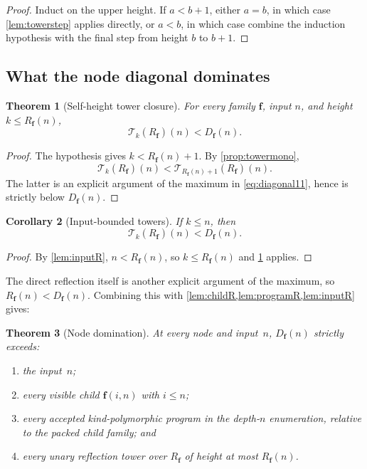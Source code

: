 \documentclass[11pt]{article}
\newtheorem{theorem}{Theorem}[section]
\newtheorem{corollary}[theorem]{Corollary}
\theoremstyle{definition}
\theoremstyle{remark}
\newcommand{\Rfam}{\ensuremath{R_{\mathbf f}}}
\newcommand{\Dfam}{\ensuremath{D_{\mathbf f}}}
\begin{document}
\begin{proof}
Induct on the upper height. If $a<b+1$, either $a=b$, in which case
\cref{lem:towerstep} applies directly, or $a<b$, in which case combine the
induction hypothesis with the final step from height $b$ to $b+1$.
\end{proof}

\subsection{What the node diagonal dominates}

\begin{theorem}[Self-height tower closure]
\label{thm:towerclosure}
For every family $\mathbf f$, input $n$, and height $k\le\Rfam(n)$,
\[
  \mathcal T_k(\Rfam)(n)<\Dfam(n).
\]
\end{theorem}

\begin{proof}
The hypothesis gives $k<\Rfam(n)+1$. By
\cref{prop:towermono},
\[
  \mathcal T_k(\Rfam)(n)
  <\mathcal T_{\Rfam(n)+1}(\Rfam)(n).
\]
The latter is an explicit argument of the maximum in
\cref{eq:diagonal11}, hence is strictly below $\Dfam(n)$.
\end{proof}

\begin{corollary}[Input-bounded towers]
If $k\le n$, then
\[
  \mathcal T_k(\Rfam)(n)<\Dfam(n).
\]
\end{corollary}

\begin{proof}
By \cref{lem:inputR}, $n<\Rfam(n)$, so $k\le\Rfam(n)$ and
\cref{thm:towerclosure} applies.
\end{proof}

The direct reflection itself is another explicit argument of the maximum, so
$\Rfam(n)<\Dfam(n)$. Combining this with
\cref{lem:childR,lem:programR,lem:inputR} gives:

\begin{theorem}[Node domination]
\label{thm:nodedom}
At every node and input~$n$, $\Dfam(n)$ strictly exceeds:
\begin{enumerate}[leftmargin=*]
\item the input~$n$;
\item every visible child $\mathbf f(i,n)$ with $i\le n$;
\item every accepted kind-polymorphic program in the depth-$n$ enumeration,
  relative to the packed child family; and
\item every unary reflection tower over $\Rfam$ of height at most $\Rfam(n)$.
\end{enumerate}
\end{theorem}
\end{document}
